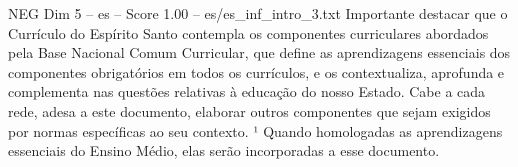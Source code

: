\begin{textsample}{NEG Dim 5 – es – Score 1.00 – es/es\_inf\_intro\_3.txt}
Importante destacar que o Currículo do Espírito Santo contempla os componentes curriculares abordados pela Base Nacional Comum Curricular, que define as aprendizagens essenciais dos componentes obrigatórios em todos os currículos, e os contextualiza, aprofunda e complementa nas questões relativas à educação do nosso Estado.
Cabe a cada rede, adesa a este documento, elaborar outros componentes que sejam exigidos por normas específicas ao seu contexto. ¹ Quando homologadas as aprendizagens essenciais do Ensino Médio, elas serão incorporadas a esse documento.

\end{textsample}
